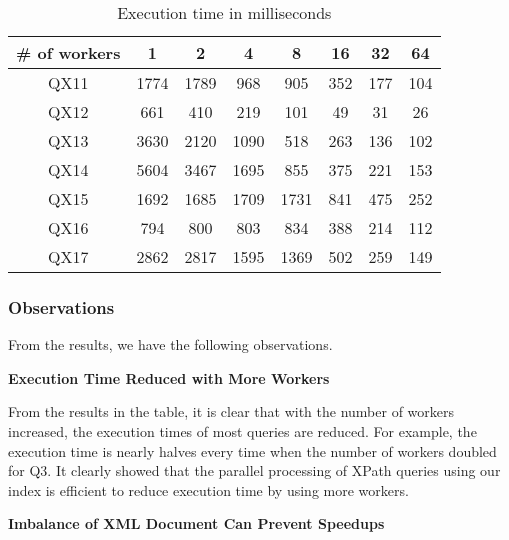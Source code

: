 \begin{table*}[ht]
	\centering
	\caption{Execution time in milliseconds}
	\label{tab:exetimes}
	\begin{tabular}{|c|c|c|c|c|c|c|c|}
		\hline
		\# of workers & 1       & 2       & 4       & 8       & 16      & 32      & 64      \\ \hline
		QX11                & 1774    & 1789    & 968     & 905     & 352     & 177     & 104 \\ \hline
		QX12                & 661     & 410     & 219     & 101     &  49     & 31      & 26 \\ \hline
		QX13                & 3630    & 2120    & 1090    & 518     & 263     & 136     & 102 \\ \hline
		QX14                & 5604    & 3467    & 1695    & 855     & 375     & 221     & 153 \\ \hline
		QX15                & 1692    & 1685    & 1709    & 1731    & 841     & 475     & 252 \\ \hline
		QX16                & 794     & 800     & 803     & 834     & 388     & 214     & 112 \\ \hline
		QX17                & 2862    & 2817    & 1595    & 1369    & 502     & 259     & 149 \\ \hline
	\end{tabular}
\end{table*}


\subsubsection{Observations}

From the results, we have the following observations.

\textbf{Execution Time Reduced with More Workers}

From the results in the table, it is clear that with the number of workers
increased, the execution times of most queries are reduced. For
example, the execution time is nearly halves every time when the number of
workers doubled for Q3. It clearly showed that the parallel processing of
XPath queries using our index is efficient to reduce execution time by using 
more workers.



\textbf{Imbalance of XML Document Can Prevent Speedups}

